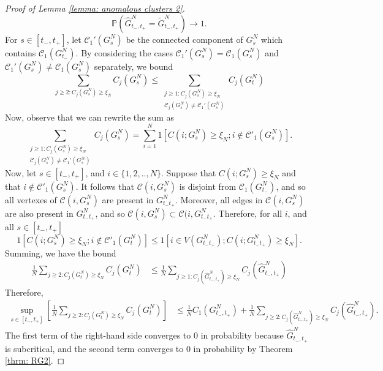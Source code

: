 \begin{proof}[Proof of Lemma \ref{lemma: anomalous clusters 2}]
\begin{equation}
    \mathbb{P}\left(\widehat{G}^N_{t_-, t_+}=\widetilde{G}^N_{t_-, t_+}\right)\rightarrow 1.
\end{equation} For $s\in [t_-, t_+]$, let $\mathcal{C}_1'(G^N_s)$ be the connected component of $G^N_s$ which contains $\mathcal{C}_1(G^N_{t_-})$. By considering the cases $\mathcal{C}_1'(G^N_s)=\mathcal{C}_1(G^N_s)$ and $\mathcal{C}_1'(G^N_s)\neq \mathcal{C}_1(G^N_s)$ separately, we bound \begin{equation}
    \sum_{j\geq 2: C_j(G^N_s)\geq \xi_N} C_j(G^N_s) \leq \sum_{\substack{j\geq 1: C_j(G^N_s)\geq \xi_N \\ \mathcal{C}_j(G^N_s)\neq \mathcal{C}_1'(G^N_s)}} C_j(G^N_t)
\end{equation} Now, observe that we can rewrite the sum as \begin{equation}
    \sum_{\substack{j\geq 1: C_j(G^N_s)\geq \xi_N \\ \mathcal{C}_j(G^N_s)\neq \mathcal{C}_1'(G^N_s)}}  C_j(G^N_s) = \sum_{i=1}^N 1[C(i; G^N_s)\geq \xi_N; i \not \in \mathcal{C}'_1(G^N_s)].
\end{equation}  Now, let $s\in [t_-, t_+]$, and $i\in\{1, 2,..,N\}$. Suppose that $C(i; G^N_s)\geq \xi_N$ and that $i \not \in \mathcal{C}'_1(G^N_s)$. It follows that $\mathcal{C}(i, G^N_s)$ is disjoint from $\mathcal{C}_1(G^N_{t_-})$, and so all vertexes of $\mathcal{C}(i, G^N_s)$ are present in $G^N_{t_-t_+}$. Moreover, all edges in $\mathcal{C}(i, G^N_s)$ are also present in $G^N_{t_-t_+}$, and so $\mathcal{C}(i, G^N_s) \subset \mathcal{C}(i, G^N_{t_-t_+}$. Therefore, for all $i$, and all $s\in [t_-, t_+]$ \begin{equation}
    1[C(i; G^N_s)\geq \xi_N; i \not \in \mathcal{C}'_1(G^N_t)] \leq 1[i \in V(G^N_{t_-t_+}); C(i; G^N_{t_-t_+})\geq \xi_N].
\end{equation} Summing, we have the bound \begin{equation}\begin{split}
\frac{1}{N}\sum_{j\geq 2: C_j(G^N_t)\geq \xi_N} C_j(G^N_t) & \leq \frac{1}{N}\sum_{j\geq 1: C_j(\widehat{G}^N_{t_-,t_+})\geq \xi_N} C_j(\widehat{G}^N_{t_-,t_+}) 
\end{split} \end{equation} Therefore, \begin{equation}\begin{split}
    \sup_{s\in [t_-, t_+]} \left[\frac{1}{N}\sum_{j\geq 2: C_j(G^N_t)\geq \xi_N} C_j(G^N_t)\right] & \leq \frac{1}{N}C_1(G^N_{t_-, t_+})+\frac{1}{N}\sum_{j\geq 2: C_j(\widehat{G}^N_{t_-,t_+})\geq \xi_N} C_j(\widehat{G}^N_{t_-,t_+}).
\end{split} \end{equation} The first term of the right-hand side converges to $0$ in probability  because $\widehat{G}^N_{t_-,t_+}$ is subcritical, and the second term converges to $0$ in probability by Theorem \ref{thrm: RG2}. \end{proof} 
